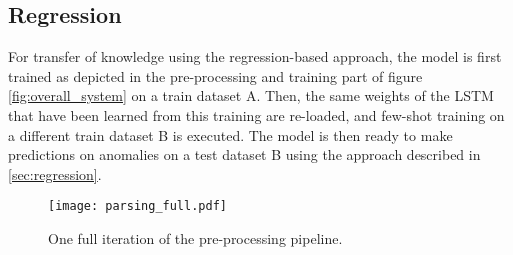 \subsection{Regression \label{sec:transfer_regression}}
For transfer of knowledge using the regression-based approach, the model is first trained as depicted in the pre-processing and training part of figure \ref{fig:overall_system} on a train dataset A. Then, the same weights of the LSTM that have been learned from this training are re-loaded, and few-shot training on a different train dataset B is executed. The model is then ready to make predictions on anomalies on a test dataset B using the approach described in \ref{sec:regression}.



\begin{figure}[htb]
  \centering
  \texttt{[image: parsing\_full.pdf]}\\
  \caption{One full iteration of the pre-processing pipeline.}
  \label{fig:full_preprocessing_pipeline}
\end{figure}







